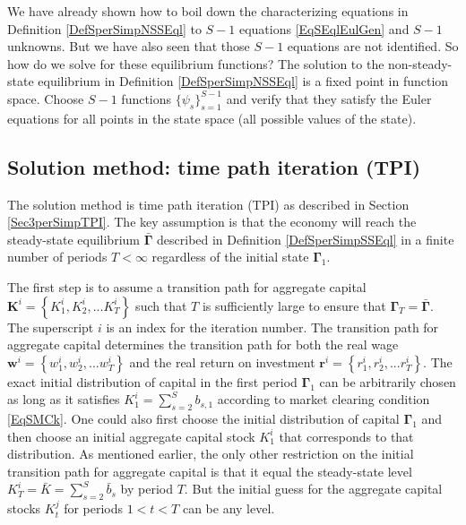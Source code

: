 \documentclass[letterpaper,12pt]{article}
\theoremstyle{definition}
\numberwithin{equation}{section}
\numberwithin{exercise}{section}
\begin{document}
      \begin{spacing}{1.5}

      We have already shown how to boil down the characterizing equations in Definition \ref{DefSperSimpNSSEql} to $S-1$ equations \eqref{EqSEqlEulGen} and $S-1$ unknowns. But we have also seen that those $S-1$ equations are not identified. So how do we solve for these equilibrium functions? The solution to the non-steady-state equilibrium in Definition \ref{DefSperSimpNSSEql} is a fixed point in function space. Choose $S-1$ functions $\{\psi_s\}_{s=1}^{S-1}$ and verify that they satisfy the Euler equations for all points in the state space (all possible values of the state).


   \subsection{Solution method: time path iteration (TPI)}\label{SecSperSimpTPI}

      The solution method is time path iteration (TPI) as described in Section \ref{Sec3perSimpTPI}. The key assumption is that the economy will reach the steady-state equilibrium $\bm{\bar{\Gamma}}$ described in Definition \ref{DefSperSimpSSEql} in a finite number of periods $T<\infty$ regardless of the initial state $\bm{\Gamma}_1$.

      The first step is to assume a transition path for aggregate capital $\bm{K}^i = \left\{K_1^i,K_2^i,...K_T^i\right\}$ such that $T$ is sufficiently large to ensure that $\bm{\Gamma}_T = \bm{\bar{\Gamma}}$. The superscript $i$ is an index for the iteration number. The transition path for aggregate capital determines the transition path for both the real wage $\bm{w}^i = \left\{w_1^i,w_2^i,...w_T^i\right\}$ and the real return on investment $\bm{r}^i = \left\{r_1^i,r_2^i,...r_T^i\right\}$. The exact initial distribution of capital in the first period $\bm{\Gamma}_1$ can be arbitrarily chosen as long as it satisfies $K_1^i = \sum_{s=2}^S b_{s,1}$ according to market clearing condition \eqref{EqSMCk}. One could also first choose the initial distribution of capital $\bm{\Gamma}_1$ and then choose an initial aggregate capital stock $K_1^i$ that corresponds to that distribution. As mentioned earlier, the only other restriction on the initial transition path for aggregate capital is that it equal the steady-state level $K_T^i = \bar{K} = \sum_{s=2}^S\bar{b}_s$ by period $T$. But the initial guess for the aggregate capital stocks $K_t^j$ for periods $1<t<T$ can be any level.


\end{spacing}
\end{document}
